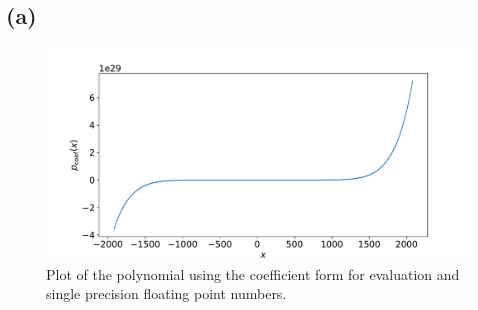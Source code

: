 \documentclass[a4paper, 11pt]{article}
\begin{document}
\FloatBarrier
\subsection*{(a)}
\begin{figure}
  \centering
  \includegraphics[width=\textwidth]{../3/a.pdf}
  \caption{Plot of the polynomial using the coefficient form for evaluation and
  single precision floating point numbers.}
  \label{fig:3_a}
\end{figure}

\FloatBarrier
\end{document}
